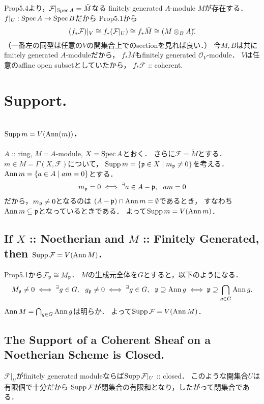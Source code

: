 \documentclass[a4paper]{jsarticle}
\newcommand{\shF}{\mathcal{F}}
\newcommand{\shO}{\mathcal{O}}
\begin{document}
    Prop5.4より，$\shF|_{\Spec A}=\tilde{M}$なる
    finitely generated $A$-module $M$が存在する．
    $f|_{U}: \operatorname{Spec} A \to \operatorname{Spec} B$だから
    Prop5.1から
    \[ (f_* \shF)|_V \iso f_* (\shF|_U) \iso f_* \tilde{M} \iso (M \otimes_{B} A) \check{}. \]
    （一番左の同型は任意の$V$の開集合上でのsectionを見れば良い．）
    今$M,B$は共にfinitely generated $A$-moduleだから，
    $f_* \tilde{M}$もfinitely generated $\shO_V$-module．
    $V$は任意のaffine open subsetとしていたから，
    $f_* \shF$ :: coherent.

\section{Support.} %
    \subsection{$\operatorname{Supp} m=V(\operatorname{Ann}(m))$.}
    $A$ :: ring, $M$ :: $A$-module, $X=\operatorname{Spec} A$とおく．
    さらに$\shF=\tilde{M}$とする．
    $m \in M=\Gamma(X,\shF)$について，
    $\operatorname{Supp} m=\{ \mathfrak{p} \in X \mid m_{\mathfrak{p}} \neq 0 \}$を考える．
    $\operatorname{Ann} m=\{a \in A \mid am=0 \}$とする．
    \[ m_{\mathfrak{p}}=0 \iff {}^{\exists} a \in A-\mathfrak{p},~~ am=0 \]
    だから，$m_{\mathfrak{p}} \neq 0$となるのは
    $(A-\mathfrak{p}) \cap \operatorname{Ann} m=\emptyset$であるとき，
    すなわち$\operatorname{Ann} m \subseteq \mathfrak{p}$となっているときである．
    よって$\operatorname{Supp} m=V(\operatorname{Ann} m)$．

    \subsection{If $X$ :: Noetherian and $M$ :: Finitely Generated, then $\Supp \shF=V(\Ann M)$.}
    Prop5.1から$\shF_{\I{p}} \iso M_{\I{p}}$．
    $M$の生成元全体を$G$とすると，以下のようになる．
    \[
        M_{\mathfrak{p}} \neq 0
        \iff {}^{\exists} g \in G,~~ g_{\mathfrak{p}} \neq 0
        \iff {}^{\exists} g \in G,~~ \mathfrak{p} \supseteq \operatorname{Ann} g
        \iff \mathfrak{p} \supseteq \bigcap_{g \in G} \operatorname{Ann} g.
    \]
    $\operatorname{Ann} M=\bigcap_{g \in G} \operatorname{Ann} g$は明らか．
    よって$\Supp \shF=V(\Ann M)$．

    \subsection{The Support of a Coherent Sheaf on a Noetherian Scheme is Closed.}
    $\shF|_{U}$がfinitely generated moduleならば$\Supp \shF|_{U}$ :: closed．
    このような開集合$U$は有限個で十分だから
    $\Supp \shF$が閉集合の有限和となり，したがって閉集合である．
\end{document}
